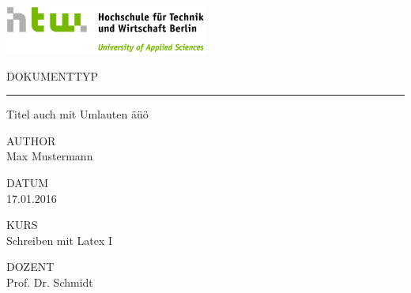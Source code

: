 \documentclass[12pt,a4paper]{report}
\begin{document}
  \begin{titlepage}

    \includegraphics[width=0.50\textwidth]{HTW_Logo_quer_rgb.jpg}

	  \vspace{4.0cm}

    \begin{changemargin}{0.5cm}{0.0cm} 		
			\color{htwgrau}
			\normalsize
			\textsf{\noindent\MakeUppercase{Dokumenttyp}} \vspace{-20pt}\\
			\noindent\rule{\textwidth}{0.5pt}\vspace{-4pt}		
			\color{black}
			\huge
			\textsf{Titel auch mit Umlauten äüö}
			\vspace{12pt}
			
			\color{htwgrau}
			\normalsize
			\textsf{\MakeUppercase{Author}}\\
			\color{black}
			\large
			\textsf{Max Mustermann}
			
			\color{htwgrau}
			\normalsize
			\textsf{\MakeUppercase{Datum}}\\
			\color{black}
			\large
			\textsf{17.01.2016}

			\vfill

			\color{htwgrau}
			\normalsize
			\textsf{\MakeUppercase{Kurs}}\\
			\color{black}
			\large
			\textsf{Schreiben mit Latex I}
			
			\color{htwgrau}
			\normalsize
			\textsf{\MakeUppercase{Dozent}}\\
			\color{black}
			\large
			\textsf{Prof. Dr. Schmidt}
			\vspace{-60pt}
		\end{changemargin} 		
	\end{titlepage}
\end{document}
